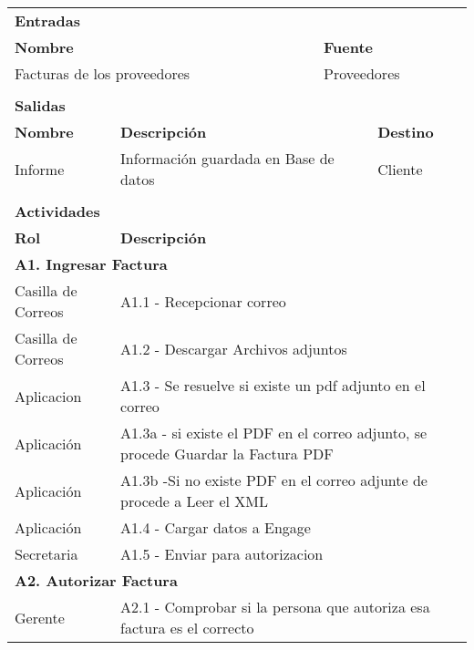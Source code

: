 \begin{longtable}{|llrrrrrr|}
          &       &       &       &       &       &       &  \\ \hline
    \multicolumn{8}{|l|}{\textbf{Entradas}} \\ \hline
    \multicolumn{5}{|l|}{\textbf{Nombre}}   & \multicolumn{3}{|l|}{\textbf{Fuente}} \\ \hline
    \multicolumn{5}{|l|}{Facturas de los proveedores} & \multicolumn{3}{|l|}{Proveedores} \\  \hline
       &       &       &       &       &       &       &  \\ \hline
    \multicolumn{8}{|l|}{\textbf{Salidas}} \\ \hline
    \textbf{Nombre} & \multicolumn{5}{|l|}{\textbf{Descripción}} & \multicolumn{2}{|l|}{\textbf{Destino}} \\ \hline
    Informe & \multicolumn{5}{|l|}{Información guardada en Base de datos} & \multicolumn{2}{|l|}{Cliente} \\ \hline
       &       &       &       &       &       &       &  \\ \hline
\multicolumn{8}{|l|}{\textbf{Actividades}} \\ \hline
    \textbf{Rol} & \multicolumn{7}{|l|}{\textbf{Descripción}} \\ \hline
    \multicolumn{8}{|l|}{\textbf{A1. Ingresar Factura}} \\ \hline
   Casilla de Correos & \multicolumn{7}{|l|}{A1.1 - Recepcionar correo } \\ \hline 
   Casilla de Correos & \multicolumn{7}{|l|}{A1.2 - Descargar Archivos adjuntos  } \\ \hline
   Aplicacion & \multicolumn{7}{|l|}{A1.3 - Se resuelve si existe un pdf adjunto en el correo  } \\ \hline
   Aplicación & \multicolumn{7}{|m{12cm}|}{A1.3a - si existe el PDF en el correo adjunto, se procede Guardar la Factura PDF} \\ \hline
   Aplicación & \multicolumn{7}{|m{12cm}|}{A1.3b -Si no existe PDF en el correo adjunte de procede a Leer el XML} \\ \hline
   Aplicación& \multicolumn{7}{|l|}{A1.4 - Cargar datos a Engage} \\ \hline
   Secretaria & \multicolumn{7}{|l|}{A1.5 - Enviar para autorizacion} \\ \hline
    \multicolumn{8}{|l|}{\textbf{A2. Autorizar Factura}} \\ \hline
    Gerente & \multicolumn{7}{|m{12cm}|}{A2.1 - Comprobar si la persona que autoriza esa factura es el correcto} \\ \hline

\end{longtable}
